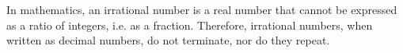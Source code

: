 In mathematics, an irrational number is a real number that cannot be expressed as a ratio of integers, i.e. as a fraction. Therefore, irrational numbers, when written as decimal numbers, do not terminate, nor do they repeat.

